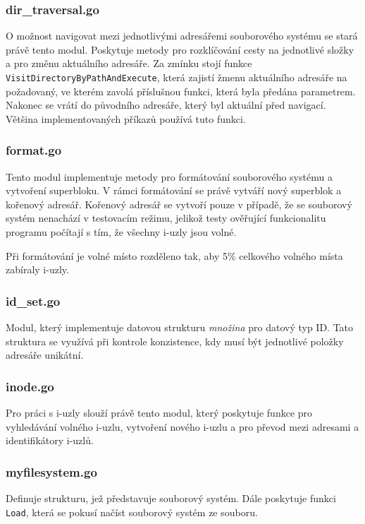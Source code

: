 \documentclass[12pt, a4paper]{article}
\begin{document}
			\subsubsection{dir\_traversal.go}
O možnost navigovat mezi jednotlivými adresářemi souborového systému se stará právě tento modul. Poskytuje metody pro rozklíčování cesty na jednotlivé složky a pro změnu aktuálního adresáře. Za zmínku stojí funkce \texttt{VisitDirectoryByPathAndExecute}, která zajistí žmenu aktuálního adresáře na požadovaný, ve kterém zavolá příslušnou funkci, která byla předána parametrem. Nakonec se vrátí do původního adresáře, který byl aktuální před navigací. Většina implementovaných příkazů používá tuto funkci.

\subsubsection{format.go}
Tento modul implementuje metody pro formátování souborového systému a vytvoření superbloku. V rámci formátování se právě vytváří nový superblok a kořenový adresář. Kořenový adresář se vytvoří pouze v případě, že se souborový systém nenachází v testovacím režimu, jelikož testy ověřující funkcionalitu programu počítají s tím, že všechny i-uzly jsou volné.

Při formátování je volné místo rozděleno tak, aby 5\% celkového volného místa zabíraly i-uzly.

\subsubsection{id\_set.go}
Modul, který implementuje datovou strukturu \textit{množina} pro datový typ ID. Tato struktura se využívá při kontrole konzistence, kdy musí být jednotlivé položky adresáře unikátní.

			\subsubsection{inode.go}
Pro práci s i-uzly slouží právě tento modul, který poskytuje funkce pro vyhledávání volného i-uzlu, vytvoření nového i-uzlu a pro převod mezi adresami a identifikátory i-uzlů.

			\subsubsection{myfilesystem.go}
Definuje strukturu, jež představuje souborový systém. Dále poskytuje funkci \texttt{Load}, která se pokusí načíst souborový systém ze souboru. 
\end{document}
